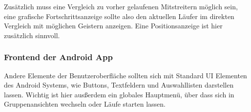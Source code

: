 Zusätzlich muss eine Vergleich zu vorher gelaufenen Mitstreitern möglich sein, eine grafische Fortschrittsanzeige sollte also den aktuellen Läufer im direkten Vergleich mit möglichen Geistern anzeigen. Eine Positionsanzeige ist hier zusätzlich sinnvoll.
\subsubsection{Frontend der Android App}
Andere Elemente der Benutzeroberfläche sollten sich mit Standard UI Elementen des Android Systems, wie Buttons, Textfeldern und Auswahllisten darstellen lassen. Wichtig ist hier ausßerdem ein globales Hauptmenü, über dass sich in Gruppenansichten wechseln oder Läufe starten lassen.